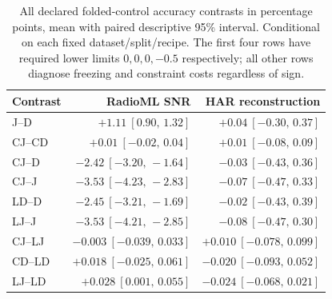\begin{table}[t]
\centering
\caption{All declared folded-control accuracy contrasts in percentage points, mean with paired descriptive 95\% interval. Conditional on each fixed dataset/split/recipe. The first four rows have required lower limits $0,0,0,-0.5$ respectively; all other rows diagnose freezing and constraint costs regardless of sign.}
\label{tab:compiled_contrasts}
\small
\begin{tabular}{lrr}
\toprule
Contrast & RadioML SNR & HAR reconstruction \\
\midrule
J--D & $+1.11\ [0.90,\,1.32]$ & $+0.04\ [-0.30,\,0.37]$ \\
CJ--CD & $+0.01\ [-0.02,\,0.04]$ & $+0.01\ [-0.08,\,0.09]$ \\
CJ--D & $-2.42\ [-3.20,\,-1.64]$ & $-0.03\ [-0.43,\,0.36]$ \\
CJ--J & $-3.53\ [-4.23,\,-2.83]$ & $-0.07\ [-0.47,\,0.33]$ \\
LD--D & $-2.45\ [-3.21,\,-1.69]$ & $-0.02\ [-0.43,\,0.39]$ \\
LJ--J & $-3.53\ [-4.21,\,-2.85]$ & $-0.08\ [-0.47,\,0.30]$ \\
CJ--LJ & $-0.003\ [-0.039,\,0.033]$ & $+0.010\ [-0.078,\,0.099]$ \\
CD--LD & $+0.018\ [-0.025,\,0.061]$ & $-0.020\ [-0.093,\,0.052]$ \\
LJ--LD & $+0.028\ [0.001,\,0.055]$ & $-0.024\ [-0.068,\,0.021]$ \\
\bottomrule
\end{tabular}
\end{table}
